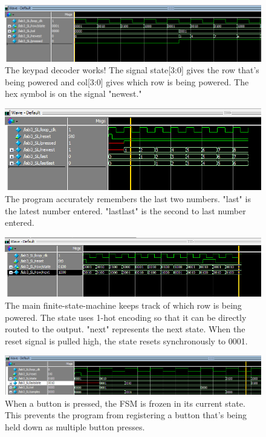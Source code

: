 \documentclass[11pt]{article}
\begin{document}
\begin{figure}[h!]
\centering
\includegraphics[scale=0.65]{keypad_decode.png}
\caption{The keypad decoder works! The signal state[3:0] gives the row that's being powered and col[3:0] gives which row is being powered. The hex symbol is on the signal "newest."}
\label{fig:keypad_decode}
\end{figure} 


\begin{figure}[h!]
\centering
\includegraphics[scale=0.8]{mem.png}
\caption{The program accurately remembers the last two numbers. "last" is the latest number entered. "lastlast" is the second to last number entered.}
\label{fig:mem}
\end{figure} 


\begin{figure}[h!]
\centering
\includegraphics[scale=0.7]{rows.png}
\caption{The main finite-state-machine keeps track of which row is being powered. The state uses 1-hot encoding so that it can be directly routed to the output. "next" represents the next state. When the reset signal is pulled high, the state resets synchronously to 0001.}
\label{fig:states}
\end{figure} 


\begin{figure}[h!]
\centering
\includegraphics[scale=0.6]{state_change_on_button.png}
\caption{When a button is pressed, the FSM is frozen in its current state. This prevents the program from registering a button that's being held down as multiple button presses.}
\label{fig:button_held_down}
\end{figure} 
\end{document}
